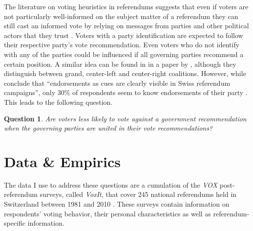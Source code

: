 \documentclass[11pt,a4paper]{article}\usepackage[]{graphicx}\usepackage[]{color}
\newtheorem{question}{Question}
\begin{document}
    The literature on voting heuristics in referendums suggests that even if voters are not particularly well-informed on the subject matter of a referendum they can still cast an informed vote by relying on messages from parties and other political actors that they trust \citep{lupia_shortcuts_1994}.   
    Voters with a party identification are expected to follow their respective party's vote recommendation. Even voters who do not identify with any of the parties could be influenced if all governing parties recommend a certain position. A similar 
    idea can be found in in a paper by \citet{sciarini_campaign_2011}, although they distinguish between grand, center-left and center-right coalitions. However, while \citet[766]{christin_interests_2002} conclude that ``endorsements as cues are clearly visible in Swiss referendum campaigns'', only 30\% of respondents seem to know endorsements of their party \citep{gruner_stimmburger_1983}. This leads to the following question. 
    	
     \begin{question}
    	\begin{minipage}[t]{4 in}
    	Are voters less likely to vote against a government recommendation when the governing parties are united in their vote recommendations?
      \end{minipage}
     \end{question}
    
    
    
    \section{Data \& Empirics}\label{sec:data}
    
    The data I use to address these questions are a cumulation of the \textit{VOX} post-referendum surveys, called \textit{VoxIt}, that cover 245 national referendums held in Switzerland between 1981 and 2010 \citep{brunner_voxit:_????}. These surveys contain information on respondents’ voting behavior, their personal characteristics as well as referendum-specific information.
    
\end{document}

